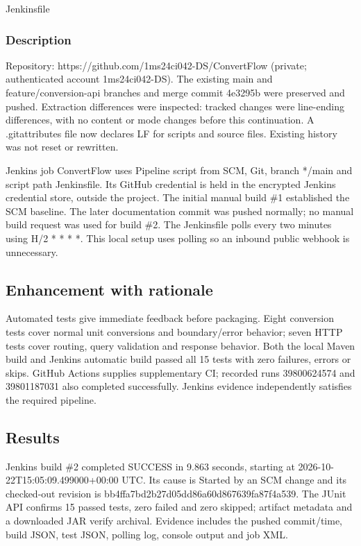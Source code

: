 \documentclass[12pt,a4paper]{article}
\begin{document}
Jenkinsfile


\subsubsection*{Description}
Repository: https://github.com/1ms24ci042-DS/ConvertFlow (private; authenticated account 1ms24ci042-DS). The existing main and feature/conversion-api branches and merge commit 4e3295b were preserved and pushed. Extraction differences were inspected: tracked changes were line-ending differences, with no content or mode changes before this continuation. A .gitattributes file now declares LF for scripts and source files. Existing history was not reset or rewritten.

Jenkins job ConvertFlow uses Pipeline script from SCM, Git, branch */main and script path Jenkinsfile. Its GitHub credential is held in the encrypted Jenkins credential store, outside the project. The initial manual build \#1 established the SCM baseline. The later documentation commit was pushed normally; no manual build request was used for build \#2. The Jenkinsfile polls every two minutes using H/2 * * * *. This local setup uses polling so an inbound public webhook is unnecessary.

\subsection*{Enhancement with rationale}
Automated tests give immediate feedback before packaging. Eight conversion tests cover normal unit conversions and boundary/error behavior; seven HTTP tests cover routing, query validation and response behavior. Both the local Maven build and Jenkins automatic build passed all 15 tests with zero failures, errors or skips. GitHub Actions supplies supplementary CI; recorded runs 39800624574 and 39801187031 also completed successfully. Jenkins evidence independently satisfies the required pipeline.

\subsection*{Results}
Jenkins build \#2 completed SUCCESS in 9.863 seconds, starting at 2026-10-22T15:05:09.499000+00:00 UTC. Its cause is Started by an SCM change and its checked-out revision is bb4ffa7bd2b27d05dd86a60d867639fa87f4a539. The JUnit API confirms 15 passed tests, zero failed and zero skipped; artifact metadata and a downloaded JAR verify archival. Evidence includes the pushed commit/time, build JSON, test JSON, polling log, console output and job XML.
\end{document}
